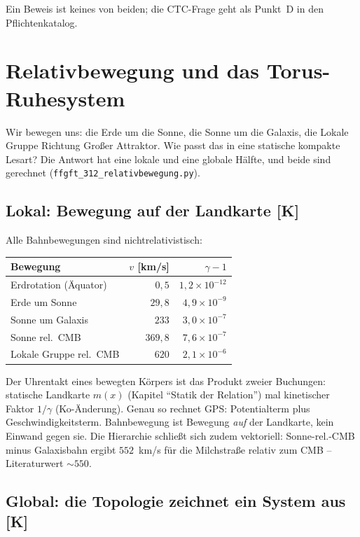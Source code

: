 \documentclass[11pt]{report}
\begin{document}
Ein Beweis ist keines von beiden; die CTC-Frage geht als Punkt~D in
den Pflichtenkatalog.

\chapter{Relativbewegung und das Torus-Ruhesystem}

Wir bewegen uns: die Erde um die Sonne, die Sonne um die Galaxis,
die Lokale Gruppe Richtung Großer Attraktor. Wie passt das in eine
statische kompakte Lesart? Die Antwort hat eine lokale und eine
globale Hälfte, und beide sind gerechnet
(\texttt{ffgft\_312\_relativbewegung.py}).

\section{Lokal: Bewegung auf der Landkarte [K]}

Alle Bahnbewegungen sind nichtrelativistisch:

\begin{center}
\begin{tabular}{lrr}
\toprule
Bewegung & $v$ [km/s] & $\gamma-1$ \\
\midrule
Erdrotation (Äquator) & $0{,}5$ & $1{,}2\times10^{-12}$ \\
Erde um Sonne & $29{,}8$ & $4{,}9\times10^{-9}$ \\
Sonne um Galaxis & $233$ & $3{,}0\times10^{-7}$ \\
Sonne rel.\ CMB & $369{,}8$ & $7{,}6\times10^{-7}$ \\
Lokale Gruppe rel.\ CMB & $620$ & $2{,}1\times10^{-6}$ \\
\bottomrule
\end{tabular}
\end{center}

Der Uhrentakt eines bewegten Körpers ist das Produkt zweier
Buchungen: statische Landkarte $m(x)$ (Kapitel \enquote{Statik der
Relation}) mal kinetischer Faktor $1/\gamma$ (Ko-Änderung). Genau so
rechnet GPS: Potentialterm plus Geschwindigkeitsterm. Bahnbewegung
ist Bewegung \emph{auf} der Landkarte, kein Einwand gegen sie. Die
Hierarchie schließt sich zudem vektoriell: Sonne-rel.-CMB minus
Galaxisbahn ergibt $552$~km/s für die Milchstraße relativ zum CMB
-- Literaturwert $\sim550$.

\section{Global: die Topologie zeichnet ein System aus [K]}
\end{document}
